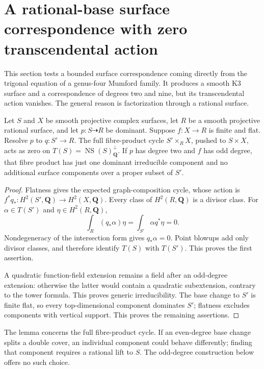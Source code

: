 \section{A rational-base surface correspondence with zero transcendental action}
\label{sec:mumford-fiber-product}

This section tests a bounded surface correspondence coming directly
from the trigonal equation of a genus-four Mumford family.
It produces a smooth K3 surface and a correspondence of degrees
two and nine, but its transcendental action vanishes.
The general reason is factorization through a rational surface.

\begin{lemma}\label{lem:rational-base-fiber-product}
Let $S$ and $X$ be smooth projective complex surfaces, let $R$ be
a smooth projective rational surface, and let $p:S\dashrightarrow R$
be dominant.  Suppose $f:X\to R$ is finite and flat.
Resolve $p$ to $q:S'\to R$.  The full fibre-product cycle
$S'\times_R X$, pushed to $S\times X$, acts as zero on
$T(S)=\operatorname{NS}(S)_{\mathbf Q}^{\perp}$.
If $p$ has degree two and $f$ has odd degree, that fibre product
has just one dominant irreducible component and no additional
surface components over a proper subset of $S'$.
\end{lemma}

\begin{proof}
Flatness gives the expected graph-composition cycle, whose action is
$f^*q_*:H^2(S',\mathbf Q)\to H^2(X,\mathbf Q)$.
Every class of $H^2(R,\mathbf Q)$ is a divisor class.
For $\alpha\in T(S')$ and $\eta\in H^2(R,\mathbf Q)$,
\[
 \int_R(q_*\alpha)\eta=\int_{S'}\alpha q^*\eta=0.
\]
Nondegeneracy of the intersection form gives $q_*\alpha=0$.
Point blowups add only divisor classes, and therefore identify
$T(S)$ with $T(S')$.  This proves the first assertion.

A quadratic function-field extension remains a field after an
odd-degree extension: otherwise the latter would contain a
quadratic subextension, contrary to the tower formula.
This proves generic irreducibility.  The base change to $S'$ is
finite flat, so every top-dimensional component dominates $S'$;
flatness excludes components with vertical support.  This proves
the remaining assertions.
\end{proof}

The lemma concerns the full fibre-product cycle.  If an even-degree
base change splits a double cover, an individual component could
behave differently; finding that component requires a rational
lift to $S$.  The odd-degree construction below offers no such
choice.

